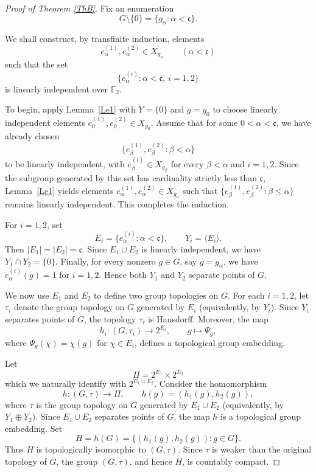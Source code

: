\documentclass[12pt]{amsart}
\theoremstyle{definition}
\numberwithin{equation}{section}
\theoremstyle{remark}
\begin{document}
\begin{proof}[Proof of Theorem \ref{ThB}] Fix an enumeration
\[
G\setminus\{0\}=\{g_\alpha:\alpha<\mathfrak c\}.
\]

We shall construct, by transfinite induction, elements
\[
e_\alpha^{(1)},e_\alpha^{(2)}\in X_{g_\alpha}
\qquad (\alpha<\mathfrak c)
\]
such that the set
\[
\{e_\alpha^{(i)}:\alpha<\mathfrak c,\ i=1,2\}
\]
is linearly independent over $\mathbb F_2$.

To begin, apply Lemma~\ref{Le1} with $Y=\{0\}$ and $g=g_0$ to choose linearly independent elements $e_0^{(1)},e_0^{(2)}\in X_{g_0}$. Assume that for some $0<\alpha<\mathfrak c$, we have already chosen
\[
\{e_\beta^{(1)},e_\beta^{(2)}:\beta<\alpha\}
\]
to be linearly independent,
with $e_\beta^{(i)}\in X_{g_\beta}$ for every $\beta<\alpha$ and $i=1,2$. Since the subgroup generated by this set has cardinality strictly less than $\mathfrak c$, Lemma~\ref{Le1} yields elements
$
e_\alpha^{(1)},e_\alpha^{(2)}\in X_{g_\alpha}
$
such that $\{e_\beta^{(1)},e_\beta^{(2)}:\beta\le\alpha\}$ remains linearly independent. This completes the induction.

For $i=1,2$, set
\[
E_i=\{e_\alpha^{(i)}:\alpha<\mathfrak c\},
\qquad
Y_i=\langle E_i\rangle .
\]
Then $|E_1|=|E_2|=\mathfrak c$. Since $E_1\cup E_2$ is linearly independent, we have $Y_1\cap Y_2=\{0\}$. Finally, for every nonzero $g\in G$, say $g=g_\alpha$, we have $e_\alpha^{(i)}(g)=1$ for $i=1,2$. Hence both $Y_1$ and $Y_2$ separate points of $G$.

We now use $E_1$ and $E_2$ to define two group topologies on $G$. For each $i=1,2$, let $\tau_i$ denote the group topology on $G$ generated by $E_i$ (equivalently, by $Y_i$).
Since $Y_i$ separates points of $G$, the topology $\tau_i$ is Hausdorff.
Moreover, the map
\[
h_i:(G,\tau_i)\to 2^{E_i},
\qquad
g\mapsto\Psi_g,
\]
where $\Psi_g(\chi)=\chi(g)$ for $\chi\in E_i$, defines a topological group embedding.

Let
\[
\Pi=2^{E_1}\times2^{E_2}
\]
which we naturally identify with $2^{E_1\cup E_2}$. Consider the homomorphism
\[
h:(G,\tau)\longrightarrow\Pi,\qquad
h(g)=(h_1(g),h_2(g)),
\]
where $\tau$ is the group topology on $G$ generated by
$E_1\cup E_2$ (equivalently, by $Y_1\oplus Y_2$).
Since $E_1\cup E_2$ separates points of $G$, the map $h$ is a
topological group embedding. Set
\[
H=h(G)=\{(h_1(g),h_2(g)):g\in G\}.
\]
Thus $H$ is topologically isomorphic to $(G,\tau)$.
Since $\tau$ is weaker than the original topology of $G$, the group
$(G,\tau)$, and hence $H$, is countably compact.


\end{proof}
\end{document}
